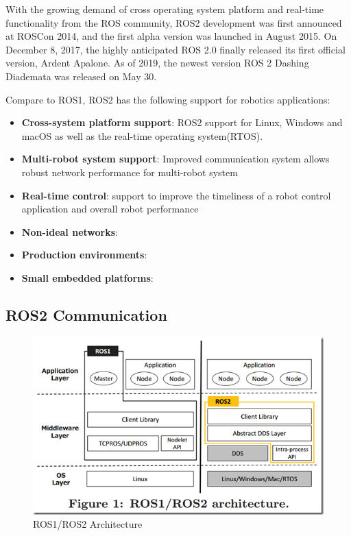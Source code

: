 \documentclass[12pt]{article}
\begin{document}
With the growing demand of cross operating system platform and real-time functionality from the ROS community, ROS2 development was first announced at ROSCon 2014, and the first alpha version was launched in August 2015. On December 8, 2017, the highly anticipated ROS 2.0 finally released its first official version, Ardent Apalone. As of 2019, the newest version ROS 2 Dashing Diademata was released on May 30.

Compare to ROS1, ROS2 has the following support for robotics applications: 
\begin{itemize}
  \item \textbf{Cross-system platform support}: ROS2 support for Linux, Windows and macOS as well as the real-time operating system(RTOS).
  \item \textbf{Multi-robot system support}: Improved communication system allows robust network performance for multi-robot system 
  \item \textbf{Real-time control}: support to improve the timeliness of a robot control application and overall robot performance
  \item \textbf{Non-ideal networks}:
  \item \textbf{Production environments}:
  \item \textbf{Small embedded platforms}:
\end{itemize}
 


\subsection{ROS2 Communication}

\begin{figure}
  \includegraphics[width=\linewidth]{ros1_ros2_architecture.png}
  \caption{ROS1/ROS2 Architecture}
  \label{fig:boat1}
\end{figure}
\end{document}
